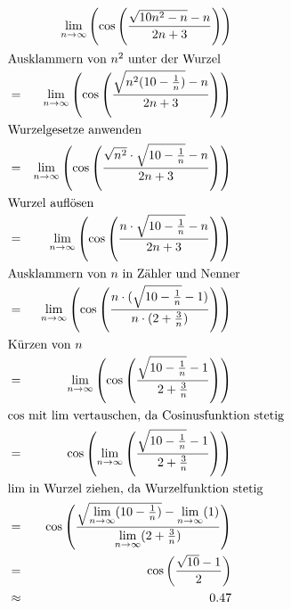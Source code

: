 \documentclass[10pt,a4paper,oneside,ngerman,numbers=noenddot]{scrartcl}
\begin{document}
\subsection{} %
\begin{alignat*}{2}
&& \underset{n \rightarrow \infty}{\text{lim}} \left( \text{cos} \left( \frac{\sqrt{10n^{2}-n}-n}{2n+3} \right) \right) \\
\intertext{Ausklammern von $n^{2}$ unter der Wurzel}
&=& \underset{n \rightarrow \infty}{\text{lim}} \left( \text{cos} \left( \frac{\sqrt{n^{2} (10-\frac{1}{n})}-n}{2n+3} \right) \right) \\
\intertext{Wurzelgesetze anwenden}
&=& \underset{n \rightarrow \infty}{\text{lim}} \left( \text{cos} \left( \frac{\sqrt{n^{2}} \cdot \sqrt{10-\frac{1}{n}}-n}{2n+3} \right) \right) \\
\intertext{Wurzel auflösen}
&=& \underset{n \rightarrow \infty}{\text{lim}} \left( \text{cos} \left( \frac{n \cdot \sqrt{10-\frac{1}{n}}-n}{2n+3} \right) \right) \\
\intertext{Ausklammern von $n$ in Zähler und Nenner}
&=& \underset{n \rightarrow \infty}{\text{lim}} \left( \text{cos} \left( \frac{n \cdot (\sqrt{10 - \frac{1}{n}} - 1)}{n \cdot (2 + \frac{3}{n})} \right) \right) \\
\intertext{Kürzen von $n$}
&=& \underset{n \rightarrow \infty}{\text{lim}} \left( \text{cos} \left( \frac{\sqrt{10 - \frac{1}{n}} - 1}{2 + \frac{3}{n}} \right) \right) \\
\intertext{cos mit lim vertauschen, da Cosinusfunktion stetig}
&=& \text{cos} \left( \underset{n \rightarrow \infty}{\text{lim}} \left( \frac{\sqrt{10 - \frac{1}{n}} - 1}{2 + \frac{3}{n}} \right) \right) \\
\intertext{lim in Wurzel ziehen, da Wurzelfunktion stetig}
&=& \text{cos} \left( \frac{\sqrt{\underset{n \rightarrow \infty}{\text{lim}} (10 - \frac{1}{n})} - \underset{n \rightarrow \infty}{\text{lim}} (1) }{\underset{n \rightarrow \infty}{\text{lim}} (2 + \frac{3}{n})} \right) \\
&=& \text{cos} \left( \frac{\sqrt{10} - 1}{2} \right)\\
&\approx & 0.47 
\end{alignat*}
\end{document}
